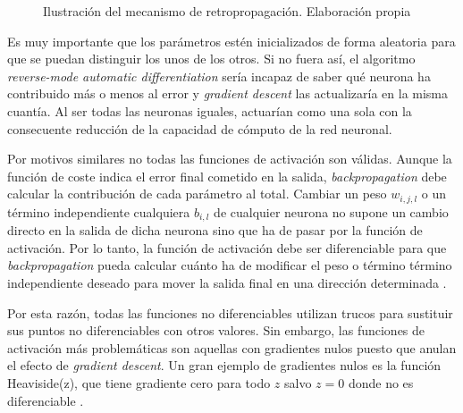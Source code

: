 \begin{figure}[htbp]
	\caption{Ilustración del mecanismo de retropropagación. Elaboración propia}
	\label{fig:backpropagation}
\end{figure}
\FloatBarrier

Es muy importante que los parámetros estén inicializados de forma aleatoria para que se puedan distinguir los unos de los otros. Si no fuera así, el algoritmo \textit{reverse-mode automatic differentiation} sería incapaz de saber qué neurona ha contribuido más o menos al error y \textit{gradient descent} las actualizaría en la misma cuantía. Al ser todas las neuronas iguales, actuarían como una sola con la consecuente reducción de la capacidad de cómputo de la red neuronal.

Por motivos similares no todas las funciones de activación son válidas. Aunque la función de coste indica el error final cometido en la salida, \textit{backpropagation} debe calcular la contribución de cada parámetro al total. Cambiar un peso $w_{i,j,l}$ o un término independiente cualquiera $b_{i,l}$ de cualquier neurona no supone un cambio directo en la salida de dicha neurona sino que ha de pasar por la función de activación. Por lo tanto, la función de activación debe ser diferenciable para que \textit{backpropagation} pueda calcular cuánto ha de modificar el peso o término término independiente deseado para mover la salida final en una dirección determinada \cite{machinelearningbook}.

Por esta razón, todas las funciones no diferenciables utilizan trucos para sustituir sus puntos no diferenciables con otros valores. Sin embargo, las funciones de activación más problemáticas son aquellas con gradientes nulos puesto que anulan el efecto de \textit{gradient descent}. Un gran ejemplo de gradientes nulos es la función Heaviside(z), que tiene gradiente cero para todo $z$ salvo $z=0$ donde no es diferenciable \cite{machinelearningbook}.

